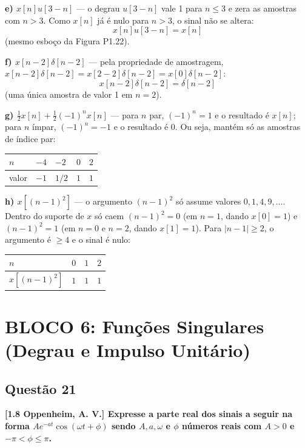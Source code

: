 \textbf{e) \(x[n]u[3 - n]\)} --- o degrau \(u[3 - n]\) vale 1 para \(n \le 3\) e zera as amostras com \(n > 3\). Como \(x[n]\) já é nulo para \(n > 3\), o sinal não se altera:
\[x[n]u[3 - n] = x[n]\]
(mesmo esboço da Figura P1.22).

\textbf{f) \(x[n - 2]\delta[n - 2]\)} --- pela propriedade de amostragem, \(x[n-2]\delta[n-2] = x[2-2]\delta[n-2] = x[0]\delta[n-2]\):
\[x[n - 2]\delta[n - 2] = \delta[n - 2]\]
(uma única amostra de valor 1 em \(n = 2\)).

\textbf{g) \(\tfrac{1}{2}x[n] + \tfrac{1}{2}(-1)^n x[n]\)} --- para \(n\) par, \((-1)^n = 1\) e o resultado é \(x[n]\); para \(n\) ímpar, \((-1)^n = -1\) e o resultado é 0. Ou seja, mantém só as amostras de índice par:

\begin{longtable}[]{@{}lllll@{}}
\toprule\noalign{}
\(n\) & \(-4\) & \(-2\) & \(0\) & \(2\) \\
\midrule\noalign{}
\endhead
\bottomrule\noalign{}
\endlastfoot
valor & \(-1\) & \(1/2\) & \(1\) & \(1\) \\
\end{longtable}

\textbf{h) \(x[(n - 1)^2]\)} --- o argumento \((n-1)^2\) só assume valores \(0, 1, 4, 9, \dots\). Dentro do suporte de \(x\) só caem \((n-1)^2 = 0\) (em \(n = 1\), dando \(x[0] = 1\)) e \((n-1)^2 = 1\) (em \(n = 0\) e \(n = 2\), dando \(x[1] = 1\)). Para \(|n - 1| \ge 2\), o argumento é \(\ge 4\) e o sinal é nulo:

\begin{longtable}[]{@{}llll@{}}
\toprule\noalign{}
\(n\) & \(0\) & \(1\) & \(2\) \\
\midrule\noalign{}
\endhead
\bottomrule\noalign{}
\endlastfoot
\(x[(n-1)^2]\) & \(1\) & \(1\) & \(1\) \\
\end{longtable}

\section{BLOCO 6: Funções Singulares (Degrau e Impulso Unitário)}\label{bloco-6-funuxe7uxf5es-singulares-degrau-e-impulso-unituxe1rio}

\subsection{Questão 21}\label{questuxe3o-21}

\textbf{{[}1.8 Oppenheim, A. V.{]} Expresse a parte real dos sinais a seguir na forma \(Ae^{-at} \cos(\omega t + \phi)\) sendo \(A, a, \omega\) e \(\phi\) números reais com \(A > 0\) e \(-\pi < \phi \le \pi\).}

